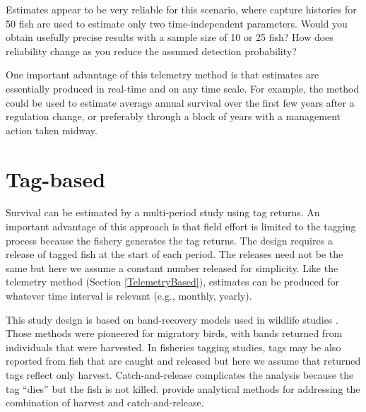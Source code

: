 \documentclass[
]{krantz}
\begin{document}
Estimates appear to be very reliable for this scenario, where capture histories for 50 fish are used to estimate only two time-independent parameters. Would you obtain usefully precise results with a sample size of 10 or 25 fish? How does reliability change as you reduce the assumed detection probability?

One important advantage of this telemetry method is that estimates are essentially produced in real-time and on any time scale. For example, the method could be used to estimate average annual survival over the first few years after a regulation change, or preferably through a block of years with a management action taken midway.

\hypertarget{BrownieSurvival}{%
\section{Tag-based}\label{BrownieSurvival}}

Survival can be estimated by a multi-period study using tag returns. An important advantage of this approach is that field effort is limited to the tagging process because the fishery generates the tag returns. The design requires a release of tagged fish at the start of each period. The releases need not be the same but here we assume a constant number released for simplicity. Like the telemetry method (Section \ref{TelemetryBased}), estimates can be produced for whatever time interval is relevant (e.g., monthly, yearly).

This study design is based on band-recovery models used in wildlife studies \citep{brownie.etal1985, williams.etal_2002}. Those methods were pioneered for migratory birds, with bands returned from individuals that were harvested. In fisheries tagging studies, tags may be also reported from fish that are caught and released but here we assume that returned tags reflect only harvest. Catch-and-release complicates the analysis because the tag ``dies'' but the fish is not killed. \citet{jiang.etal_2007} provide analytical methods for addressing the combination of harvest and catch-and-release.
\end{document}
